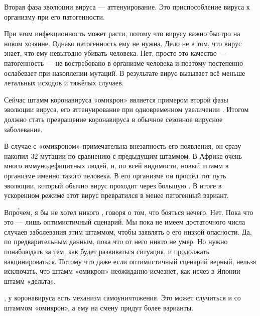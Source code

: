 Вторая фаза эволюции вируса --- аттенуирование. Это приспособление вируса к организму при  его патогенности.

При этом инфекционность может расти, потому что вирусу важно быстро  на новом хозяине. Однако  патогенность ему не нужна. Дело не в том, что вирус  знает, что ему невыгодно убивать человека. Нет, просто это качество --- патогенность --- не востребовано в организме человека и поэтому постепенно ослабевает при накоплении мутаций. В результате вирус вызывает всё меньше летальных исходов и тяжёлых случаев.

\begin{fancyquotes}
    Сейчас штамм коронавируса «омикрон» является примером второй фазы эволюции вируса,  его аттенуирование при одновременном увеличении . Итогом должно стать превращение коронавируса в обычное сезонное вирусное заболевание.
\end{fancyquotes}

В случае с «омикроном» примечательна внезапность его появления, он сразу накопил 32 мутации по сравнению с предыдущим штаммом. В Африке очень много иммунодефицитных людей, и, по всей видимости, новый штамм  в организме именно такого человека. В его организме он прошёл тот путь эволюции, который обычно вирус проходит через большую  . В итоге в ускоренном режиме этот вирус превратился в менее патогенный вариант.

Впр\'{о}чем, я бы не хотел никого , говоря о том, что бояться нечего. Нет. Пока что это --- лишь оптимистичный сценарий. Мы пока не имеем достаточного числа случаев заболевания этим штаммом, чтобы заявлять о его низкой опасности. Да, по предварительным данным, пока что от него никто не умер. Но нужно понаблюдать за тем, как будет развиваться ситуация, и продолжать вакцинироваться. Потому что даже если оптимистичный сценарий верный, нельзя исключать, что штамм «омикрон» неожиданно исчезнет, как исчез в Японии штамм «дельта».

, у коронавируса есть механизм самоуничтожения. Это может случиться и со штаммом «омикрон», а ему на смену придут более  варианты.

